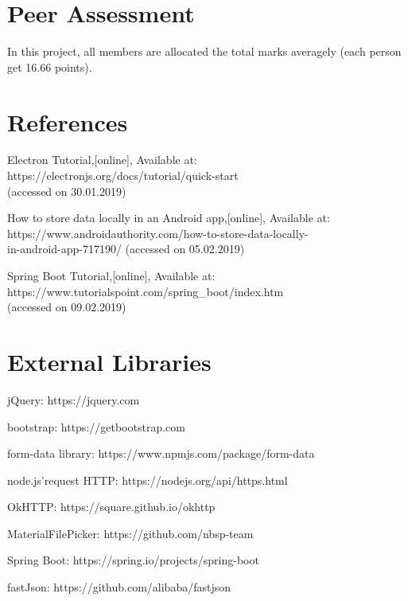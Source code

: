 \documentclass[11pt]{article}
\newcommand*{\circled}[1]{\lower.7ex\hbox{\tikz\draw (0pt, 0pt)%
		circle (.5em) node {\makebox[1em][c]{\small #1}};}}
\begin{document}
\clearpage

\section{Peer Assessment}
In this project, all members are allocated the total marks averagely (each person get 16.66 points).



\section{References}
\begin{enumerate}[label={[}\arabic*{]}]
	\item Electron Tutorial,{[}online{]}, Available at:
	\\
	https://electronjs.org/docs/tutorial/quick-start
	\\
	(accessed on 30.01.2019)

	\item How to store data locally in an Android app,{[}online{]}, Available at:
	\\
	https://www.androidauthority.com/how-to-store-data-locally-
	\\
	in-android-app-717190/ (accessed on 05.02.2019)
	
	\item Spring Boot Tutorial,{[}online{]}, Available at:
	\\
	https://www.tutorialspoint.com/spring\_boot/index.htm
	\\ 
	(accessed on 09.02.2019)
	
\end{enumerate}

\section{External Libraries}
\begin{enumerate}[label=\circled{\arabic*}]
\item jQuery: https://jquery.com
\item bootstrap: https://getbootstrap.com
\item form-data library: https://www.npmjs.com/package/form-data
\item node.js'request HTTP: https://nodejs.org/api/https.html
\item OkHTTP: https://square.github.io/okhttp
\item MaterialFilePicker: https://github.com/nbsp-team
\item Spring Boot: https://spring.io/projects/spring-boot
\item fastJson: https://github.com/alibaba/fastjson
\end{enumerate}
\end{document}
